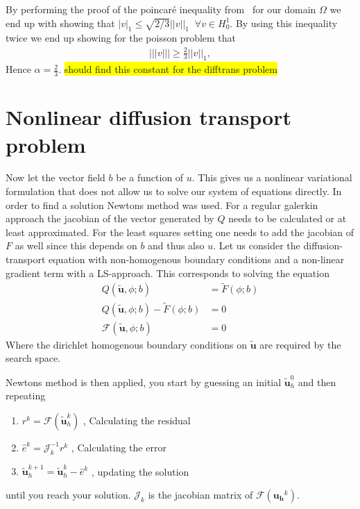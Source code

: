 By performing the proof of the poincar\'e inequality from~\cite{Quarteroni} for our domain $\Omega$ we end up with showing that $|v|_1\leq \sqrt{2/3}||v||_1 \;\; \forall v \in H^1_0$. By using this inequality twice we end up showing for the poisson problem that
\begin{align}
	|||v||| \geq \frac{2}{3}||v||_1,
	\label{eq:resultAlpha}
\end{align}
Hence $\alpha=\frac{2}{3}$. \colorbox{yellow}{should find this constant for the difftrans problem}
%
\section{Nonlinear diffusion transport problem}
Now let the vector field $b$ be a function of $u$. This gives us a nonlinear variational formulation that does not allow us to solve our system of equations directly. In order to find a solution Newtons method was used. For a regular galerkin approach the jacobian of the vector generated by $Q$ needs to be calculated or at least approximated. For the least squares setting one needs to add the jacobian of $F$ as well since this depends on $b$ and thus also $u$. 
%
Let us consider the diffusion-transport equation with non-homogenous boundary conditions and a non-linear gradient term with a LS-approach. This corresponds to solving the equation 
\begin{align}
	Q(\tilde{\mathbf{u}},\phi;b) &= \tilde{F}(\phi;b) \\
	Q(\tilde{\mathbf{u}},\phi;b) - \tilde{F}(\phi;b) &= 0\\
	\mathcal{F}(\tilde{\mathbf{u}},\phi;b) &= 0
	\label{eq:varFormNonLin}
\end{align}
%
Where the dirichlet homogenous boundary conditions on $\tilde{\mathbf{u}}$ are required by the search space.

Newtons method is then applied, you start by guessing an initial $\tilde{\mathbf{u}}_h^0$ and then repeating
%
\begin{enumerate}
	\item $r^k = \mathcal{ F } (\tilde{\mathbf{u}}_h^k)$  , Calculating the residual
	\item $\hat{e}^k = \mathcal{J}_k^{-1}r^k $  , Calculating the error 
	\item $\tilde{\mathbf{u}}_h^{k+1}=\tilde{\mathbf{u}}_h^k-\hat{e}^k$    , updating the solution
\end{enumerate}
%
until you reach your solution. $\mathcal{J}_k$ is the jacobian matrix of $\mathcal{F}(\mathbf{u_h}^k)$.


